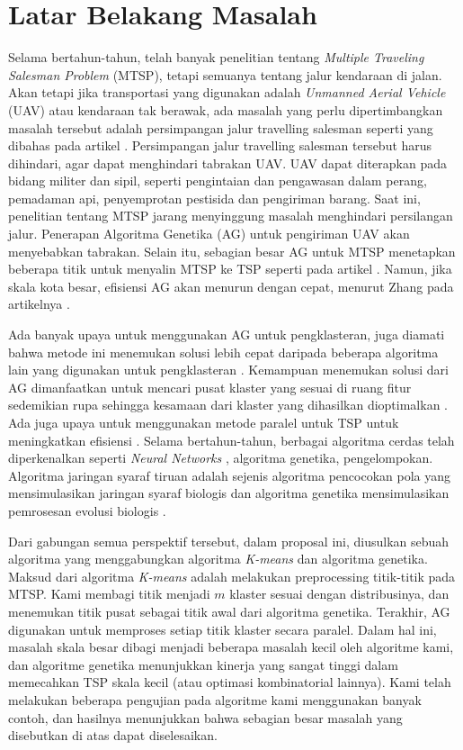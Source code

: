 \section{Latar Belakang Masalah}

Selama bertahun-tahun, telah banyak penelitian tentang \textit{Multiple Traveling Salesman Problem} (MTSP), tetapi semuanya tentang jalur kendaraan di jalan. Akan tetapi jika transportasi yang digunakan adalah \textit{Unmanned Aerial Vehicle} (UAV) atau kendaraan tak berawak, ada masalah yang perlu dipertimbangkan masalah tersebut adalah persimpangan jalur travelling salesman seperti yang dibahas pada artikel \cite{inproceedings}. Persimpangan jalur travelling salesman tersebut harus dihindari, agar dapat menghindari tabrakan UAV. UAV dapat diterapkan pada bidang militer dan sipil, seperti pengintaian dan pengawasan dalam perang, pemadaman api, penyemprotan pestisida dan pengiriman barang.
Saat ini, penelitian tentang MTSP jarang menyinggung masalah menghindari persilangan jalur. Penerapan Algoritma Genetika (AG) untuk pengiriman UAV akan menyebabkan tabrakan. Selain itu, sebagian besar AG untuk MTSP menetapkan beberapa titik untuk menyalin MTSP ke TSP seperti pada artikel \cite{shengping2002hybrid}. Namun, jika skala kota besar, efisiensi AG akan menurun dengan cepat, menurut Zhang pada artikelnya \cite{zhang2014parallel}.

Ada banyak upaya untuk menggunakan AG untuk pengklasteran, juga diamati bahwa metode ini menemukan solusi lebih cepat daripada beberapa algoritma lain yang digunakan untuk pengklasteran \cite{krishna1999genetic}. Kemampuan menemukan solusi dari AG dimanfaatkan untuk mencari pusat klaster yang sesuai di ruang fitur sedemikian rupa sehingga kesamaan dari klaster yang dihasilkan dioptimalkan \cite{maii2000genetic}. Ada juga upaya untuk menggunakan metode paralel untuk TSP untuk meningkatkan efisiensi \cite{li2016parallel}. Selama bertahun-tahun, berbagai algoritma cerdas telah diperkenalkan seperti  \textit{Neural Networks} \cite{song2015asynchronous,zhang2015universality,pan2012spiking}, algoritma genetika, pengelompokan. Algoritma jaringan syaraf tiruan adalah sejenis algoritma pencocokan pola yang mensimulasikan jaringan syaraf biologis dan algoritma genetika mensimulasikan pemrosesan evolusi biologis \cite{liu2015implementation,zeng2014spiking,xu2016probe,zhang2014efficient}.

Dari gabungan semua perspektif tersebut, dalam proposal ini, diusulkan sebuah algoritma yang menggabungkan algoritma \textit{K-means} dan algoritma genetika. Maksud dari algoritma \textit{K-means} adalah melakukan preprocessing titik-titik pada MTSP. Kami membagi titik menjadi $m$ klaster sesuai dengan distribusinya, dan menemukan titik pusat sebagai titik awal dari algoritma genetika. Terakhir, AG digunakan untuk memproses setiap titik klaster secara paralel. Dalam hal ini, masalah skala besar dibagi menjadi beberapa masalah kecil oleh algoritme kami, dan algoritme genetika menunjukkan kinerja yang sangat tinggi dalam memecahkan TSP skala kecil (atau optimasi kombinatorial lainnya). Kami telah melakukan beberapa pengujian pada algoritme kami menggunakan banyak contoh, dan hasilnya menunjukkan bahwa sebagian besar masalah yang disebutkan di atas dapat diselesaikan.